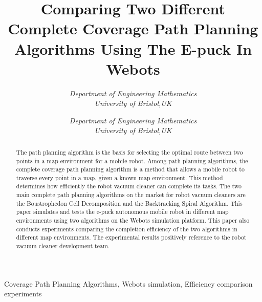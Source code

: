 \documentclass[conference]{IEEEtran}
\begin{document}
\title{Comparing Two Different Complete Coverage Path Planning Algorithms Using The E-puck In Webots}

\author{
  \textit{Department of Engineering Mathematics}\\
  \textit{University of Bristol,UK}
  \and
  \textit{Department of Engineering Mathematics}\\
  \textit{University of Bristol,UK}
}

\maketitle

\begin{abstract}
The path planning algorithm is the basis for selecting the optimal route between two points in a map environment for a mobile robot. Among path planning algorithms, the complete coverage path planning algorithm is a method that allows a mobile robot to traverse every point in a map, given a known map environment. This method determines how efficiently the robot vacuum cleaner can complete its tasks. The two main complete path planning algorithms on the market for robot vacuum cleaners are the Boustrophedon Cell Decomposition and the Backtracking Spiral Algorithm. This paper simulates and tests the e-puck autonomous mobile robot in different map environments using two algorithms on the Webots simulation platform. This paper also conducts experiments comparing the completion efficiency of the two algorithms in different map environments. The experimental results positively reference to the robot vacuum cleaner development team.
\end{abstract}

\def\IEEEkeywordsname{Keywords} 
\begin{IEEEkeywords} Coverage  Path  Planning Algorithms, Webots simulation, Efficiency comparison experiments 
\end{IEEEkeywords} 
\end{document}

